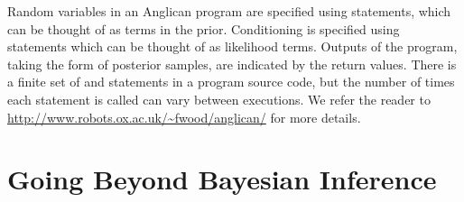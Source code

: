 Random variables in an Anglican program are specified using \sample statements, which can be thought of as terms in the prior. Conditioning is specified using \observe statements which can be thought of as likelihood terms.  Outputs of the program, taking the form of posterior samples, are indicated by the return values.  There is a finite set of \sample and \observe statements in a program source code, but the number of times each statement is called can vary between executions.  We refer the reader to  \href{http://www.robots.ox.ac.uk/~fwood/anglican/}{\small\url{http://www.robots.ox.ac.uk/~fwood/anglican/}} for more details.

\section{Going Beyond Bayesian Inference}
\label{sec:probprog:limit}

